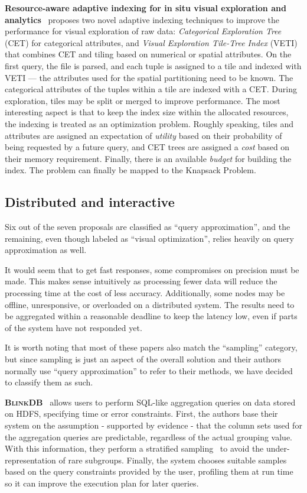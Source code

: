\textbf{Resource-aware adaptive indexing for in situ visual exploration and
analytics}~\cite{maroulis_resourceaware_2023} proposes two novel adaptive indexing techniques
to improve the performance for visual exploration of raw data:
\textit{Categorical Exploration Tree} (CET) for categorical attributes, and \textit{Visual Exploration
Tile-Tree Index} (VETI) that combines CET and tiling based on numerical or spatial attributes.
On the first query, the file is parsed, and each tuple is assigned to a tile and indexed with VETI
--- the attributes used for the spatial partitioning need to be known. The categorical attributes
of the tuples within a tile are indexed with a CET. During exploration, tiles may be split or merged
to improve performance. The most interesting aspect is that to keep the index size within
the allocated resources, the indexing is treated as an optimization problem. Roughly speaking,
tiles and attributes are assigned an expectation of \textit{utility} based on their probability of
being requested by a future query, and CET trees are assigned a \textit{cost} based on their memory
requirement. Finally, there is an available \textit{budget} for building the index.
The problem can finally be mapped to the Knapsack Problem.

\subsection{Distributed and interactive}
Six out of the seven proposals are classified as ``query approximation'', and the 
remaining, even though labeled as ``visual optimization'',
relies heavily on query approximation as well.

It would seem that to get fast responses, some compromises on precision 
must be made. This makes sense intuitively as processing fewer 
data will reduce the processing time at the cost of less accuracy. 
Additionally, some nodes may be offline, 
unresponsive, or overloaded on a distributed system. The results 
need to be aggregated within a reasonable deadline to keep the latency low, even if parts of the system 
have not responded yet.

It is worth noting that most of these papers also match the ``sampling''
category, but since sampling is just an aspect of the overall solution and their 
authors normally use ``query approximation'' to refer to their methods, we have 
decided to classify them as such.

\medskip

\textbf{\textsc{BlinkDB}}~\cite{Agarwal2013} allows users to perform SQL-like aggregation 
queries on data stored on HDFS, specifying time or error constraints. First, 
the authors base their system on the assumption - supported by evidence - that 
the column sets used for the aggregation queries are predictable, regardless of 
the actual grouping value. With this information, they perform a stratified 
sampling~\cite{Lohr2009} to avoid the under-representation of rare subgroups. 
Finally, the system chooses suitable samples based on the query constraints 
provided by the user, profiling them at run time so it can improve the 
execution plan for later queries.

